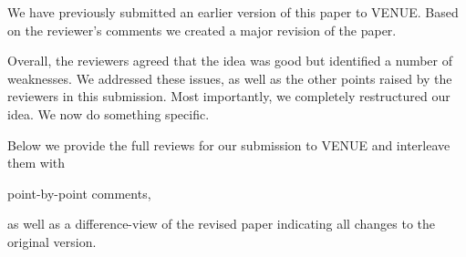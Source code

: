 We have previously submitted an earlier version of this paper to VENUE. 
Based on the reviewer's comments we created a major revision of the paper. 

Overall, the reviewers agreed that the idea was good but identified a number of weaknesses.
We addressed these issues, as well as the other points raised by the reviewers in this submission. 
Most importantly, we completely restructured our idea.
We now do something specific.

Below we provide the full reviews for our submission to VENUE and interleave them with
\begin{xresponse}
point-by-point comments,
\end{xresponse}
as well as a difference-view of the revised paper indicating all changes to the original version.